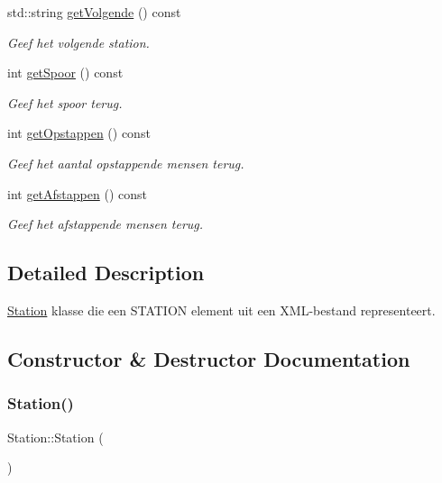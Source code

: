 \begin{DoxyCompactItemize}
std\+::string \hyperlink{class_station_a1c9f9e7d77d74e7b06bf627bcb2c0067}{get\+Volgende} () const
\begin{DoxyCompactList}\small\item\em Geef het volgende station. \end{DoxyCompactList}\item 
int \hyperlink{class_station_a081ca6373631199a30ebab56f50022d8}{get\+Spoor} () const
\begin{DoxyCompactList}\small\item\em Geef het spoor terug. \end{DoxyCompactList}\item 
int \hyperlink{class_station_a5897f83319093d502f01f18b24678aba}{get\+Opstappen} () const
\begin{DoxyCompactList}\small\item\em Geef het aantal opstappende mensen terug. \end{DoxyCompactList}\item 
int \hyperlink{class_station_a36af036851a8e31b7a2be381928dadb5}{get\+Afstappen} () const
\begin{DoxyCompactList}\small\item\em Geef het afstappende mensen terug. \end{DoxyCompactList}\end{DoxyCompactItemize}


\subsection{Detailed Description}
\hyperlink{class_station}{Station} klasse die een S\+T\+A\+T\+I\+ON element uit een X\+M\+L-\/bestand representeert. 

\subsection{Constructor \& Destructor Documentation}
\mbox{\label{class_station_a73d335726aad1d844d81cda6d9fd74e6}} 
\subsubsection{\texorpdfstring{Station()}{Station()}\hspace{0.1cm}{\footnotesize\ttfamily [1/2]}}
{\footnotesize\ttfamily Station\+::\+Station (\begin{DoxyParamCaption}{ }\end{DoxyParamCaption})}



